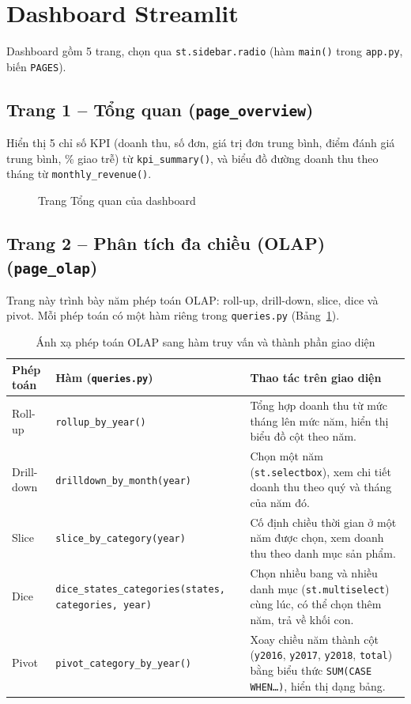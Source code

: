 \documentclass[12pt,a4paper]{article}
\newcommand{\code}[1]{\texttt{\small #1}}
\begin{document}
\section{Dashboard Streamlit}

Dashboard gồm 5 trang, chọn qua \code{st.sidebar.radio} (hàm \code{main()} trong \code{app.py}, biến \code{PAGES}).

\subsection{Trang 1 -- Tổng quan (\code{page\_overview})}
Hiển thị 5 chỉ số KPI (doanh thu, số đơn, giá trị đơn trung bình, điểm đánh giá trung bình, \% giao trễ) từ
\code{kpi\_summary()}, và biểu đồ đường doanh thu theo tháng từ \code{monthly\_revenue()}.

\begin{figure}[h]
\centering
{}
\caption{Trang Tổng quan của dashboard}\label{fig:ss-overview}
\end{figure}

\subsection{Trang 2 -- Phân tích đa chiều (OLAP) (\code{page\_olap})}
Trang này trình bày năm phép toán OLAP: roll-up, drill-down, slice, dice và pivot. Mỗi phép toán có một hàm
riêng trong \code{queries.py} (Bảng~\ref{tab:olap-map}).

\begin{table}[h]
\centering
\caption{Ánh xạ phép toán OLAP sang hàm truy vấn và thành phần giao diện}\label{tab:olap-map}
\small
\begin{tabularx}{\textwidth}{@{}l l X@{}}
\toprule
\textbf{Phép toán} & \textbf{Hàm (\code{queries.py})} & \textbf{Thao tác trên giao diện}\\
\midrule
Roll-up & \code{rollup\_by\_year()} & Tổng hợp doanh thu từ mức tháng lên mức năm, hiển thị biểu đồ cột theo năm.\\
Drill-down & \code{drilldown\_by\_month(year)} & Chọn một năm (\code{st.selectbox}), xem chi tiết doanh thu theo quý và tháng của năm đó.\\
Slice & \code{slice\_by\_category(year)} & Cố định chiều thời gian ở một năm được chọn, xem doanh thu theo danh mục sản phẩm.\\
Dice & \code{dice\_states\_categories(states, categories, year)} & Chọn nhiều bang và nhiều danh mục (\code{st.multiselect}) cùng lúc, có thể chọn thêm năm, trả về khối con.\\
Pivot & \code{pivot\_category\_by\_year()} & Xoay chiều năm thành cột (\code{y2016}, \code{y2017}, \code{y2018}, \code{total}) bằng biểu thức \code{SUM(CASE WHEN\ldots)}, hiển thị dạng bảng.\\
\bottomrule
\end{tabularx}
\end{table}
\end{document}
